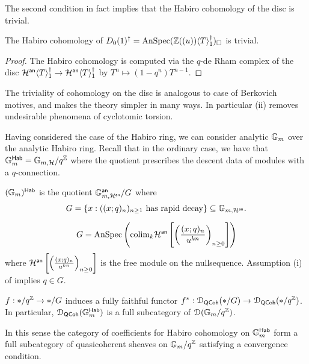 The second condition in fact implies that the Habiro cohomology of the disc is trivial.
\begin{proposition}
    The Habiro cohomology of $D_{0}(1)^{\dagger}=\mathrm{AnSpec}(\mathbb{Z}((u))\langle T\rangle_{1}^{\dagger})_{\square}$ is trivial. 
\end{proposition} 
\begin{proof}
    The Habiro cohomology is computed via the $q$-de Rham complex of the disc $\mathcal{H}^{\mathsf{an}}\langle T\rangle^{\dagger}_{1}\to\mathcal{H}^{\mathsf{an}}\langle T\rangle^{\dagger}_{1}$ by $T^{n}\mapsto (1-q^{n})T^{n-1}$.
\end{proof}
The triviality of cohomology on the disc is analogous to case of Berkovich motives, and makes the theory simpler in many ways. In particular (ii) removes undesirable phenomena of cyclotomic torsion. 

Having considered the case of the Habiro ring, we can consider analytic $\mathbb{G}_{m}$ over the analytic Habiro ring. Recall that in the ordinary case, we have that $\mathbb{G}_{m}^{\mathsf{Hab}}=\mathbb{G}_{m,\mathcal{H}}/q^{\mathbb{Z}}$ where the quotient prescribes the descent data of modules with a $q$-connection. 
\begin{definition}\label{def: analytic Gm on Habiro ring}
    $(\mathbb{G}_{m})^{\mathsf{Hab}}$ is the quotient $\mathbb{G}^{\mathsf{an}}_{m,\mathcal{H}^{\mathsf{an}}}/G$ where 
    $$G=\left\{x:((x;q)_{n})_{n\geq1}\text{ has rapid decay}\right\}\subseteq\mathbb{G}_{m,\mathcal{H}^{\mathsf{an}}}.$$
\end{definition}
\begin{remark}
    $$G=\mathrm{AnSpec}\left(\mathrm{colim}_{k}\mathcal{H}^{\mathsf{an}}\left[\left(\frac{(x;q)_{n}}{u^{kn}}\right)_{n\geq0}\right]\right)$$
    where $\mathcal{H}^{\mathsf{an}}\left[\left(\frac{(x;q)_{n}}{u^{kn}}\right)_{n\geq0}\right]$ is the free module on the nullsequence. Assumption (i) of  implies $q\in G$. 
\end{remark}
\begin{lemma}
    $f:*/q^{\mathbb{Z}}\to */G$ induces a fully faithful functor $f^{*}:\EuScript{D}_{\mathsf{QCoh}}(*/G)\to\EuScript{D}_{\mathsf{QCoh}}(*/q^{\mathbb{Z}})$. In particular, $\EuScript{D}_{\mathsf{QCoh}}(\mathbb{G}_{m}^{\mathsf{Hab}})$ is a full subcategory of $\EuScript{D}(\mathbb{G}_{m}/q^{\mathbb{Z}})$. 
\end{lemma}
In this sense the category of coefficients for Habiro cohomology on $\mathbb{G}_{m}^{\mathsf{Hab}}$ form a full subcategory of quasicoherent sheaves on $\mathbb{G}_{m}/q^{\mathbb{Z}}$ satisfying a convergence condition. 

